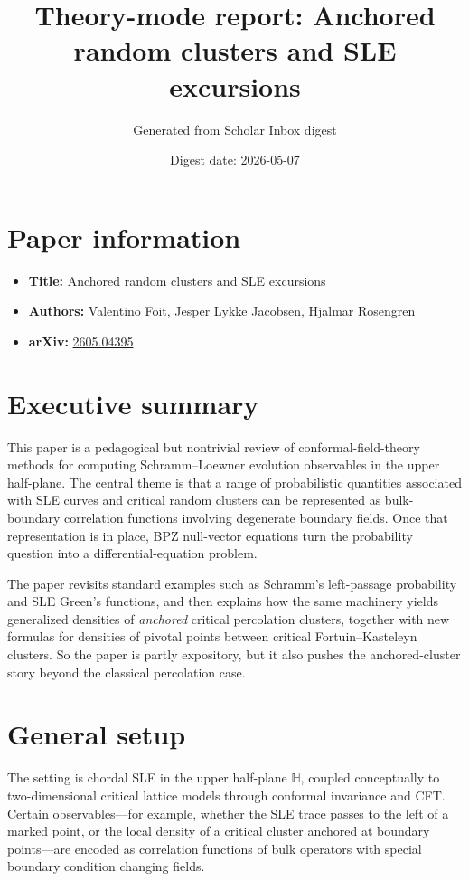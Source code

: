 \documentclass[11pt]{article}
\title{\textbf{Theory-mode report: Anchored random clusters and SLE excursions}}
\author{Generated from Scholar Inbox digest}
\date{Digest date: 2026-05-07}
\begin{document}
\maketitle
\section*{Paper information}
\begin{itemize}[leftmargin=1.5em]
\item \textbf{Title:} Anchored random clusters and SLE excursions
\item \textbf{Authors:} Valentino Foit, Jesper Lykke Jacobsen, Hjalmar Rosengren
\item \textbf{arXiv:} \href{https://arxiv.org/abs/2605.04395}{2605.04395}
\end{itemize}
\section*{Executive summary}
This paper is a pedagogical but nontrivial review of conformal-field-theory methods for computing Schramm--Loewner evolution observables in the upper half-plane. The central theme is that a range of probabilistic quantities associated with SLE curves and critical random clusters can be represented as bulk-boundary correlation functions involving degenerate boundary fields. Once that representation is in place, BPZ null-vector equations turn the probability question into a differential-equation problem.

The paper revisits standard examples such as Schramm's left-passage probability and SLE Green's functions, and then explains how the same machinery yields generalized densities of \emph{anchored} critical percolation clusters, together with new formulas for densities of pivotal points between critical Fortuin--Kasteleyn clusters. So the paper is partly expository, but it also pushes the anchored-cluster story beyond the classical percolation case.
\section*{General setup}
The setting is chordal SLE in the upper half-plane $\mathbb H$, coupled conceptually to two-dimensional critical lattice models through conformal invariance and CFT. Certain observables---for example, whether the SLE trace passes to the left of a marked point, or the local density of a critical cluster anchored at boundary points---are encoded as correlation functions of bulk operators with special boundary condition changing fields.
\end{document}
